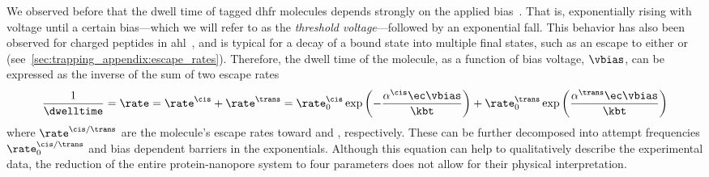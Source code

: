 We observed before that the dwell time of tagged \gls{dhfr} molecules depends strongly on the applied
bias~\cite{Biesemans-2015}. That is, exponentially rising with voltage until a certain bias---which we will
refer to as the \emph{threshold voltage}---followed by an exponential fall. This behavior has also been
observed for charged peptides in \gls{ahl}~\cite{Movileanu-2005}, and is typical for a decay of a bound state
into multiple final states, such as an escape to either \cisi{} or \transi{}
(see~\cref{sec:trapping_appendix:escape_rates}). Therefore, the dwell time of the molecule, as a function of
bias voltage, $\vbias$, can be expressed as the inverse of the sum of two escape rates~\cite{Movileanu-2005}
%
\begin{align}\label{eq:double_barrier_simple}
	\dfrac{1}{\dwelltime} = \rate = \rate^\cis + \rate^\trans	=
    \rate^\cis_0 \exp \left( -\dfrac{\alpha^\cis \ec \vbias}{\kbt} \right) +
    \rate^\trans_0 \exp \left( \dfrac{\alpha^\trans \ec \vbias}{\kbt} \right)
\end{align}
%
where $\rate^{\cis/\trans}$ are the molecule's escape rates toward \cisi{} and \transi{}, respectively. These
can be further decomposed into attempt frequencies $\rate^{\cis/\trans}_0$ and bias dependent barriers in the
exponentials. Although this equation can help to qualitatively describe the experimental data, the reduction
of the entire protein-nanopore system to four parameters does not allow for their physical interpretation.

